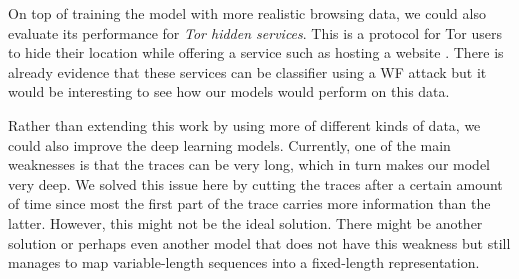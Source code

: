 On top of training the model with more realistic browsing data, we could also evaluate its performance for \textit{Tor hidden services}.
This is a protocol for Tor users to hide their location while offering a service such as hosting a website \cite{tor_hidden_services}.
There is already evidence that these services can be classifier using a WF attack \cite{kfingerprinting} but it would be interesting to see how our models would perform on this data.

Rather than extending this work by using more of different kinds of data, we could also improve the deep learning models.
Currently, one of the main weaknesses is that the traces can be very long, which in turn makes our model very deep.
We solved this issue here by cutting the traces after a certain amount of time since most the first part of the trace carries more information than the latter.
However, this might not be the ideal solution.
There might be another solution or perhaps even another model that does not have this weakness but still manages to map variable-length sequences into a fixed-length representation.

